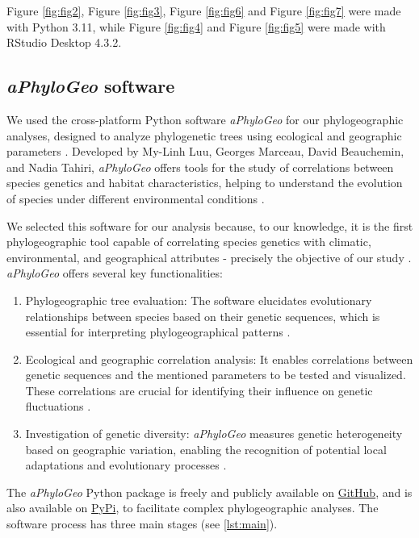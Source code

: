 Figure \ref{fig:fig2}, Figure \ref{fig:fig3}, Figure \ref{fig:fig6} and Figure \ref{fig:fig7} were made with Python 3.11, while Figure \ref{fig:fig4} and Figure \ref{fig:fig5} were made with RStudio Desktop 4.3.2.

\subsection{{\textit{aPhyloGeo} software}\label{aPhyloGeo-software}}
We used the cross-platform Python software \textit{aPhyloGeo} for our phylogeographic analyses, designed to analyze phylogenetic trees using ecological and geographic parameters \citep{koshkarov_phylogeography_2022}. Developed by My-Linh Luu, Georges Marceau, David Beauchemin, and Nadia Tahiri, \textit{aPhyloGeo} offers tools for the study of correlations between species genetics and habitat characteristics, helping to understand the evolution of species under different environmental conditions \citep{koshkarov_phylogeography_2022}. 

We selected this software for our analysis because, to our knowledge, it is the first phylogeographic tool capable of correlating species genetics with climatic, environmental, and geographical attributes - precisely the objective of our study \citep{koshkarov_phylogeography_2022}. \textit{aPhyloGeo} offers several  key functionalities:

\begin{enumerate}[label=\arabic*.]
\item Phylogeographic tree evaluation: The software elucidates evolutionary relationships between species based on their genetic sequences, which is essential for interpreting phylogeographical patterns \citep{koshkarov_phylogeography_2022}.
\item Ecological and geographic correlation analysis: It enables correlations between genetic sequences and the mentioned parameters to be tested and visualized. These correlations are crucial for identifying their influence on genetic fluctuations \citep{koshkarov_phylogeography_2022}.
\item Investigation of genetic diversity: \textit{aPhyloGeo} measures genetic heterogeneity based on geographic variation, enabling the recognition of potential local adaptations and evolutionary processes \citep{manel_perspectives_2010}.
\end{enumerate}

The \textit{aPhyloGeo} Python package is freely and publicly available on \href{https://github.com/tahiri-lab/aPhyloGeo}{GitHub}, and is also available on \href{https://pypi.org/project/aphylogeo/}{PyPi}, to facilitate complex phylogeographic analyses. The software process has three main stages (see \autoref{lst:main}).

